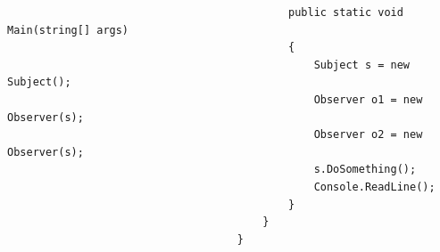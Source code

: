 \documentclass[a4paper,10pt]{article}
\begin{document}
\begin{lstlisting}
                                            public static void Main(string[] args)
                                            {
                                                Subject s = new Subject();
                                                Observer o1 = new Observer(s);
                                                Observer o2 = new Observer(s);
                                                s.DoSomething();
                                                Console.ReadLine();
                                            }
                                        }
                                    }                                \end{lstlisting}
    
                        
\end{document}
